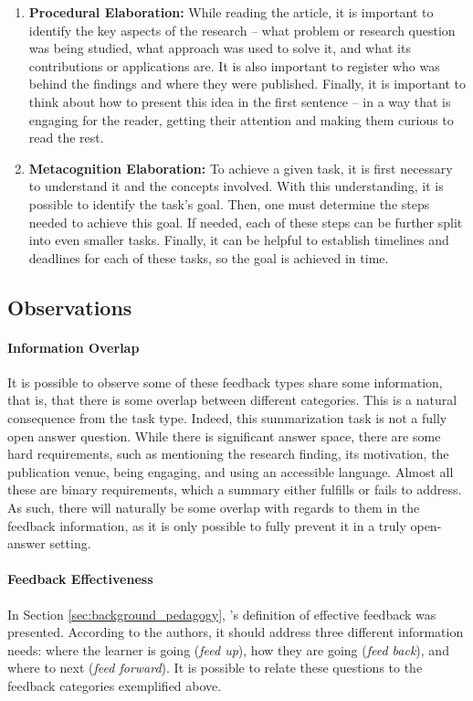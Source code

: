 \begin{enumerate}[label=\textbf{\arabic*.}]
\item \textbf{Procedural Elaboration:} While reading the article, it is important to identify the key aspects of the research -- what problem or research question was being studied, what approach was used to solve it, and what its contributions or applications are. It is also important to register who was behind the findings and where they were published. Finally, it is important to think about how to present this idea in the first sentence -- in a way that is engaging for the reader, getting their attention and making them curious to read the rest. 

\item \textbf{Metacognition Elaboration:} To achieve a given task, it is first necessary to understand it and the concepts involved. With this understanding, it is possible to identify the task’s goal. Then, one must determine the steps needed to achieve this goal. If needed, each of these steps can be further split into even smaller tasks. Finally, it can be helpful to establish timelines and deadlines for each of these tasks, so the goal is achieved in time.

\end{enumerate}

\subsection{Observations}

\paragraph{Information Overlap}
It is possible to observe some of these feedback types share some information, that is, that there is some overlap between different categories. This is a natural consequence from the task type. Indeed, this summarization task is not a fully open answer question. While there is significant answer space, there are some hard requirements, such as mentioning the research finding, its motivation, the publication venue, being engaging, and using an accessible language. Almost all these are binary requirements, which a summary either fulfills or fails to address. As such, there will naturally be some overlap with regards to them in the feedback information, as it is only possible to fully prevent it in a truly open-answer setting.


\paragraph{Feedback Effectiveness}
In Section \ref{sec:background_pedagogy}, \citet{hattie_power_2007}'s definition of effective feedback was presented. According to the authors, it should address three different information needs: where the learner is going (\textit{feed up}), how they are going (\textit{feed back}), and where to next (\textit{feed forward}). It is possible to relate these questions to the feedback categories exemplified above. 

